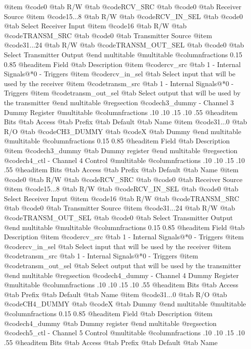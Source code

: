 @item @code{0}
@tab R/W @tab
@code{RCV_SRC}
@tab @code{0} @tab 
Receiver Source
@item @code{15...8}
@tab R/W @tab
@code{RCV_IN_SEL}
@tab @code{0} @tab 
Select Receiver Input
@item @code{16}
@tab R/W @tab
@code{TRANSM_SRC}
@tab @code{0} @tab 
Transmitter Source
@item @code{31...24}
@tab R/W @tab
@code{TRANSM_OUT_SEL}
@tab @code{0} @tab 
Select Transmitter Output
@end multitable
@multitable @columnfractions 0.15 0.85
@headitem Field @tab Description
@item @code{rcv_src} @tab 1 - Internal Signals@*0 - Triggers
@item @code{rcv_in_sel} @tab Select input that will be used by the receiver
@item @code{transm_src} @tab 1 - Internal Signals@*0 - Triggers
@item @code{transm_out_sel} @tab Select output that will be used by the transmitter
@end multitable
@regsection @code{ch3_dummy} - Channel 3 Dummy Register
@multitable @columnfractions .10 .10 .15 .10 .55
@headitem Bits @tab Access @tab Prefix @tab Default @tab Name
@item @code{31...0}
@tab R/O @tab
@code{CH3_DUMMY}
@tab @code{X} @tab 
Dummy
@end multitable
@multitable @columnfractions 0.15 0.85
@headitem Field @tab Description
@item @code{ch3_dummy} @tab Dummy register
@end multitable
@regsection @code{ch4_ctl} - Channel 4 Control
@multitable @columnfractions .10 .10 .15 .10 .55
@headitem Bits @tab Access @tab Prefix @tab Default @tab Name
@item @code{0}
@tab R/W @tab
@code{RCV_SRC}
@tab @code{0} @tab 
Receiver Source
@item @code{15...8}
@tab R/W @tab
@code{RCV_IN_SEL}
@tab @code{0} @tab 
Select Receiver Input
@item @code{16}
@tab R/W @tab
@code{TRANSM_SRC}
@tab @code{0} @tab 
Transmitter Source
@item @code{31...24}
@tab R/W @tab
@code{TRANSM_OUT_SEL}
@tab @code{0} @tab 
Select Transmitter Output
@end multitable
@multitable @columnfractions 0.15 0.85
@headitem Field @tab Description
@item @code{rcv_src} @tab 1 - Internal Signals@*0 - Triggers
@item @code{rcv_in_sel} @tab Select input that will be used by the receiver
@item @code{transm_src} @tab 1 - Internal Signals@*0 - Triggers
@item @code{transm_out_sel} @tab Select output that will be used by the transmitter
@end multitable
@regsection @code{ch4_dummy} - Channel 4 Dummy Register
@multitable @columnfractions .10 .10 .15 .10 .55
@headitem Bits @tab Access @tab Prefix @tab Default @tab Name
@item @code{31...0}
@tab R/O @tab
@code{CH4_DUMMY}
@tab @code{X} @tab 
Dummy
@end multitable
@multitable @columnfractions 0.15 0.85
@headitem Field @tab Description
@item @code{ch4_dummy} @tab Dummy register
@end multitable
@regsection @code{ch5_ctl} - Channel 5 Control
@multitable @columnfractions .10 .10 .15 .10 .55
@headitem Bits @tab Access @tab Prefix @tab Default @tab Name
